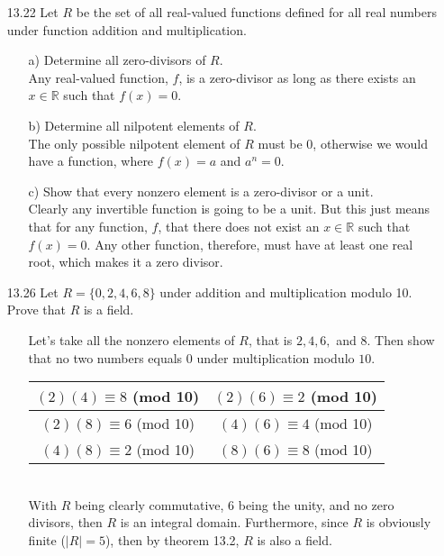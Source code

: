 \documentclass[12pt]{article}
\begin{document}
\begin{enumerate}
\item[13.22] Let $R$ be the set of all real-valued functions defined for all real numbers under function
addition and multiplication.
\begin{enumerate}
\item[a)] Determine all zero-divisors of $R$.\\
Any real-valued function, $f$, is a zero-divisor as long as there exists an $x \in \mathbb{R}$ such
that $f(x) = 0$.
\item[b)] Determine all nilpotent elements of $R$.\\
The only possible nilpotent element of $R$ must be 0, otherwise we would have a function, where
$f(x) = a$ and $a^n = 0$.
\item[c)] Show that every nonzero element is a zero-divisor or a unit.\\
Clearly any invertible function is going to be a unit. But this just means that for any function, 
$f$, that there does not exist an $x \in \mathbb{R}$ such that $f(x) = 0$. Any other function, therefore,
must have at least one real root, which makes it a zero divisor.
\end{enumerate}

\item[13.26] Let $R = \{ 0, 2, 4, 6, 8 \}$ under addition and multiplication modulo 10. Prove that $R$ is a field.
\begin{enumerate}
\item[] Let's take all the nonzero elements of $R$, that is $2, 4, 6,$ and $8$. Then show that
no two numbers equals $0$ under multiplication modulo $10$. \\
\begin{tabular}{|c|c|}
\hline
$(2)(4) \equiv 8$ (mod 10) & $(2)(6) \equiv 2$ (mod 10) \\
\hline 
$(2)(8) \equiv 6$ (mod 10) & $(4)(6) \equiv 4$ (mod 10) \\
\hline
$(4)(8) \equiv 2$ (mod 10) & $(8)(6) \equiv 8$ (mod 10) \\
\hline
\end{tabular} \\
With $R$ being clearly commutative, $6$ being the unity, and no zero divisors, then $R$ is an integral domain.
Furthermore, since $R$ is obviously finite ($|R| = 5$), then by theorem 13.2, $R$ is also a field.
\end{enumerate}


\end{enumerate}
\end{document}
